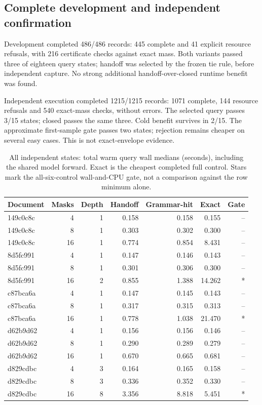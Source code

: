\subsection{Complete development and independent confirmation}

Development completed 486/486 records: 445 complete and 41 explicit resource refusals, with 216 certificate checks against exact mass. Both variants passed three of eighteen query states; handoff was selected by the frozen tie rule, before independent capture. No strong additional handoff-over-closed runtime benefit was found.

Independent execution completed 1215/1215 records: 1071 complete, 144 resource refusals and 540 exact-mass checks, without errors. The selected query passes 3/15 states; closed passes the same three. Cold benefit survives in 2/15. The approximate first-sample gate passes two states; rejection remains cheaper on several easy cases. This is not exact-envelope evidence.



\begin{table}[htbp]\centering\small
\caption{All independent states: total warm query wall medians (seconds),
including the shared model forward. Exact is the cheapest completed full
control. Stars mark the all-six-control wall-and-CPU gate, not a comparison
against the row minimum alone.}\label{tab:independent}
\begin{tabular}{lrrrrrr}\toprule
Document & Masks & Depth & Handoff & Grammar-hit & Exact & Gate\\\midrule
149c0c8c & 4 & 1 & 0.158 & 0.158 & 0.155 & --\\
149c0c8c & 8 & 1 & 0.303 & 0.302 & 0.300 & --\\
149c0c8c & 16 & 1 & 0.774 & 0.854 & 8.431 & --\\
8d5fc991 & 4 & 1 & 0.147 & 0.146 & 0.143 & --\\
8d5fc991 & 8 & 1 & 0.301 & 0.306 & 0.300 & --\\
8d5fc991 & 16 & 2 & 0.855 & 1.388 & 14.262 & *\\
c87bca6a & 4 & 1 & 0.147 & 0.145 & 0.143 & --\\
c87bca6a & 8 & 1 & 0.317 & 0.315 & 0.313 & --\\
c87bca6a & 16 & 1 & 0.778 & 1.038 & 21.470 & *\\
d62b9d62 & 4 & 1 & 0.156 & 0.156 & 0.146 & --\\
d62b9d62 & 8 & 1 & 0.290 & 0.289 & 0.279 & --\\
d62b9d62 & 16 & 1 & 0.670 & 0.665 & 0.681 & --\\
d829cdbc & 4 & 3 & 0.164 & 0.165 & 0.158 & --\\
d829cdbc & 8 & 3 & 0.336 & 0.352 & 0.330 & --\\
d829cdbc & 16 & 8 & 3.356 & 8.818 & 5.451 & *\\
\bottomrule\end{tabular}\end{table}



